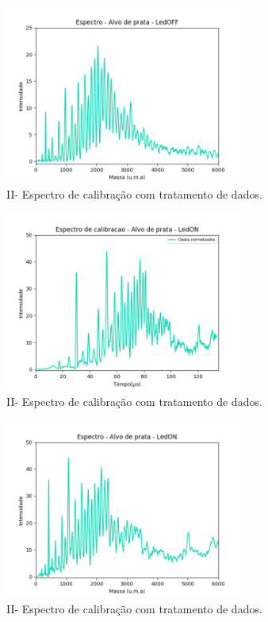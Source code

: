 \begin{figure}
  \centering  
  \includegraphics[width=0.7\textwidth]{exp_02/LEDOFF_espec_calib_ag_massa.png}
  \caption{II- Espectro de calibração com tratamento de dados.}
  \label{fig:02_ledoff_massa} 
\end{figure}



\begin{figure}
  \centering  
  \includegraphics[width=0.7\textwidth]{exp_02/LEDON_normalizado_mcp.png}
  \caption{II- Espectro de calibração com tratamento de dados.}
  \label{fig:02_ledon_dados_tratados} 
\end{figure}

\begin{figure}
  \centering  
  \includegraphics[width=0.7\textwidth]{exp_02/LEDON_espec_calib_ag_massa.png}
  \caption{II- Espectro de calibração com tratamento de dados.}
  \label{fig:02_ledon_massa} 
\end{figure}

